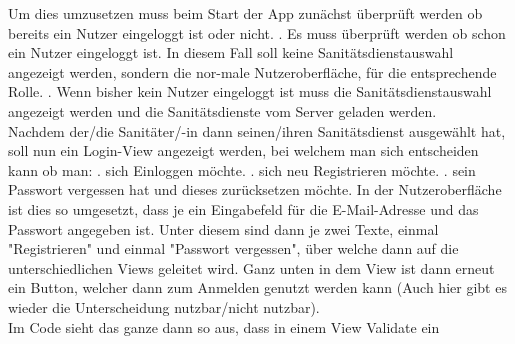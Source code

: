         
        Um dies umzusetzen muss beim Start der App zunächst überprüft werden 
        ob bereits ein Nutzer eingeloggt ist oder nicht.
        . Es muss überprüft werden ob schon ein Nutzer eingeloggt ist. In diesem 
        \hspace*{5mm}Fall soll keine Sanitätsdienstauswahl angezeigt werden, sondern
        die nor-\hspace*{5mm}male Nutzeroberfläche, für die entsprechende Rolle.
        . Wenn bisher kein Nutzer eingeloggt ist muss die Sanitätsdienstauswahl 
        \hspace*{5mm}angezeigt werden und die Sanitätsdienste vom Server geladen 
        werden.
        \newline\\
        Nachdem der/die Sanitäter/-in dann seinen/ihren Sanitätsdienst ausgewählt hat,
        soll nun ein Login-View angezeigt werden, bei welchem man sich entscheiden 
        kann ob man:
        . sich Einloggen möchte.
        . sich neu Registrieren möchte.
        . sein Passwort vergessen hat und dieses zurücksetzen möchte.
        \newline
        In der Nutzeroberfläche ist dies so umgesetzt, dass je ein Eingabefeld für
        die E-Mail-Adresse und das Passwort angegeben ist. Unter diesem sind dann je
        zwei Texte, einmal "Registrieren" und einmal "Passwort vergessen", über
        welche dann auf die unterschiedlichen Views geleitet wird. Ganz unten in dem
        View ist dann erneut ein Button, welcher dann zum Anmelden genutzt werden 
        kann (Auch hier gibt es wieder die Unterscheidung nutzbar/nicht nutzbar).
        \\
        Im Code sieht das ganze dann so aus, dass in einem View \glqq Validate \grqq{} ein 
